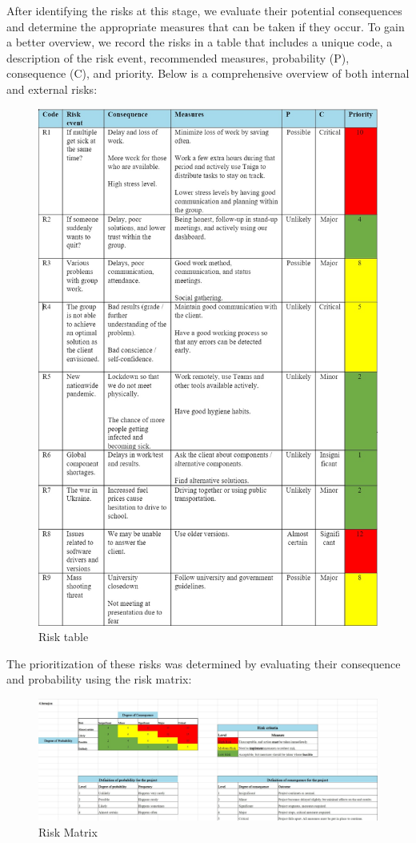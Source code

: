 After identifying the risks at this stage, we evaluate their potential consequences and determine the appropriate measures that can be taken if they occur. To gain a better overview, we record the risks in a table that includes a unique code, a description of the risk event, recommended measures, probability (P), consequence (C), and priority. Below is a comprehensive overview of both internal and external risks:


\begin{figure}
\centering
\includegraphics[width=0.80\linewidth]{fig/RisikoTabell.jpg}
\caption{Risk table}
\label{fig:Risktable}
\end{figure}

\newpage

The prioritization of these risks was determined by evaluating their consequence and probability using the risk matrix:

\begin{figure}[h!]
\centering
\includegraphics[width=0.85\linewidth]{fig/RiskMatrix.jpg}
\caption{Risk Matrix \cite{RiskMatrix}} 
\label{fig:RiskMatrix}
\end{figure}
\newpage